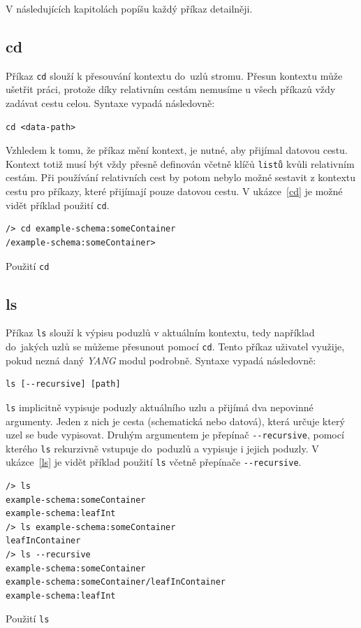 \documentclass[thesis=B,czech,hidelinks]{FITthesis}[2019/03/06]
\begin{document}
V následujících kapitolách popíšu každý příkaz detailněji.

\subsection{cd}
Příkaz \texttt{cd} slouží k přesouvání kontextu do~uzlů stromu. Přesun kontextu může ušetřit práci, protože díky relativním cestám nemusíme u všech příkazů vždy zadávat cestu celou. Syntaxe vypadá následovně:
\begin{verbatim}
cd <data-path>
\end{verbatim}
Vzhledem k tomu, že příkaz mění kontext, je nutné, aby přijímal datovou cestu. Kontext totiž musí být vždy přesně definován včetně klíčů \texttt{listů} kvůli relativním cestám. Při používání relativních cest by potom nebylo možné sestavit z kontextu cestu pro příkazy, které přijímají pouze datovou cestu. V ukázce~\ref{cd} je možné vidět příklad použití \texttt{cd}.

\begin{listing}[H]
\begin{verbatim}
/> cd example-schema:someContainer
/example-schema:someContainer>
\end{verbatim}
\caption{Použití \texttt{cd}}\label{cd}
\end{listing}

\subsection{ls}
Příkaz \texttt{ls} slouží k výpisu poduzlů v aktuálním kontextu, tedy například do~jakých uzlů se můžeme přesunout pomocí \texttt{cd}. Tento příkaz uživatel využije, pokud nezná daný \textit{YANG} modul podrobně. Syntaxe vypadá následovně:
\begin{verbatim}
ls [--recursive] [path]
\end{verbatim}
\texttt{ls} implicitně vypisuje poduzly aktuálního uzlu a přijímá dva nepovinné argumenty. Jeden z nich je cesta (schematická nebo datová), která určuje který uzel se bude vypisovat. Druhým argumentem je přepínač \verb¨--recursive¨, pomocí kterého \texttt{ls} rekurzivně vstupuje do~poduzlů a vypisuje i jejich poduzly. V ukázce~\ref{ls} je vidět příklad použití \texttt{ls} včetně přepínače \verb¨--recursive¨.

\begin{listing}[H]
\begin{verbatim}
/> ls
example-schema:someContainer
example-schema:leafInt
/> ls example-schema:someContainer
leafInContainer
/> ls --recursive
example-schema:someContainer
example-schema:someContainer/leafInContainer
example-schema:leafInt
\end{verbatim}
\caption{Použití \texttt{ls}}\label{ls}
\end{listing}
\end{document}
